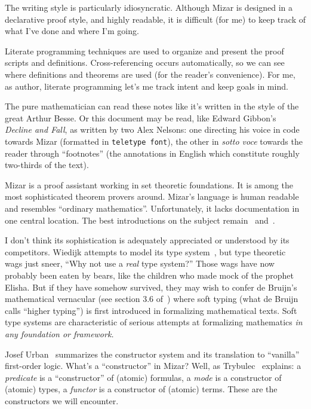 The writing style is particularly idiosyncratic. Although Mizar is
designed in a declarative proof style, and highly readable, it is
difficult (for me) to keep track of what I've done and where I'm going.

Literate programming techniques are used to organize and present the
proof scripts and definitions. Cross-referencing occurs automatically,
so we can see where definitions and theorems are used (for the reader's
convenience). For me, as author, literate programming let's me track
intent and keep goals in mind.

The pure mathematician can read these notes like it's written in the
style of the great Arthur Besse. Or this document may be read, like
Edward Gibbon's
\emph{Decline and Fall}, as written by two Alex Nelsons: one directing
his voice in code towards Mizar (formatted in \verb#teletype font#), the
other in \emph{sotto voce} towards the reader through ``footnotes'' (the
annotations in English which constitute roughly two-thirds of the text).

Mizar is a proof assistant working in set theoretic foundations. It is
among the most sophisticated theorem provers around. Mizar's language is
human readable and resembles ``ordinary mathematics''. Unfortunately, it
lacks documentation in one central location. The best introductions on
the subject remain~\cite{grabowski2010mizar} and~\cite{wiedijk2006mizman}.

I don't think its sophistication is adequately appreciated or understood
by its competitors. Wiedijk attempts to model its type
system~\cite{wiedijk2007mizar}, but type theoretic wags just sneer,
``Why not use a \emph{real} type system?'' Those wags have now probably been eaten
by bears, like the children who made mock of the prophet Elisha. But if
they have somehow survived, they may wish to confer de Bruijn's mathematical
vernacular (see section {3.6} of~\cite{de1994mathematical}) where soft
typing (what de Bruijn calls ``higher typing'') is first introduced in
formalizing mathematical texts. Soft type systems are characteristic of
serious attempts at formalizing mathematics \emph{in any foundation or framework.}

Josef Urban~\cite{urban2003translating} summarizes the constructor
system and its translation to ``vanilla'' first-order logic. What's a
``constructor'' in Mizar? Well, as Trybulec~\cite{trybulec1993some}
explains: a \emph{predicate} is a ``constructor'' of (atomic) formulas,
a \emph{mode} is a constructor of (atomic) types, a \emph{functor} is a
constructor of (atomic) terms. These are the constructors we will
encounter.

